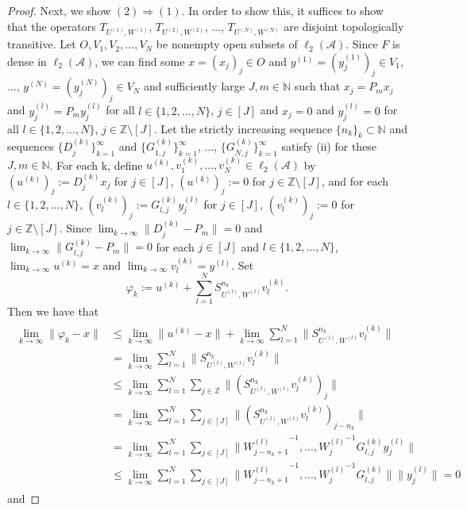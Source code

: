 \documentclass{article}
\begin{document}
\begin{proof}
Next, we show $(2)\Rightarrow(1)$. In order to show this, it suffices to show that the operators $T_{U^{(1)},W^{(1)}}$, $T_{U^{(2)},W^{(2)}}$, ..., $T_{U^{(N)},W^{(N)}}$ are disjoint topologically transitive. Let $O, V_{1}, V_{2}, ...,  V_{N}$ be nonempty open subsets of $\ell_{2}(\mathcal{A})$. Since $F$ is dense in $\ell_{2}(\mathcal{A})$, we can find some $x=(x_{j})_{j}\in O$ and $y^{(1)}=(y^{(1)}_{j})_{j}\in V_{1}$, ..., $y^{(N)}=(y^{(N)}_{j})_{j}\in V_{N}$ and sufficiently large $J, m\in\mathbb{N}$ such that $x_{j}=P_{m}x_{j}$ and $y^{(l)}_{j}=P_{m}y^{(l)}_{j}$ for all $l\in\{1,2,...,N\}$,   $j\in[J]$ and $x_{j}=0$ and $y^{(l)}_{j}=0$ for all $l\in\{1,2,...,N\}$, $j\in \mathbb{Z}\setminus[J]$. Let the strictly increasing sequence $\{n_{k}\}_{k}\subset\mathbb{N}$ and sequences $\{D^{(k)}_{j}\}^{\infty}_{k=1}$ and $\{G^{(k)}_{1,j}\}^{\infty}_{k=1}$, ..., $\{G^{(k)}_{N,j}\}^{\infty}_{k=1}$ satisfy (ii) for these $J,m\in\mathbb{N}$. For each k, define $u^{(k)}, v^{(k)}_{1}, ..., v^{(k)}_{N}\in \ell_{2}(\mathcal{A})$ by $(u^{(k)})_{j}:=D^{(k)}_{j}x_{j}$ for $j\in[J]$, $(u^{(k)})_{j}:=0$ for $j\in \mathbb{Z}\setminus [J]$, and for each $l\in\{1,2,...,N\}$, $(v^{(k)}_{l})_{j}:=G^{(k)}_{l, j}y^{(l)}_{j}$ for $j\in[J]$, $(v^{(k)}_{l})_{j}:=0$ for $j\in \mathbb{Z}\setminus [J]$. Since $\lim_{k\rightarrow\infty}\|D^{(k)}_{j}-P_{m}\|=0$ and $\lim_{k\rightarrow\infty}\|G^{(k)}_{l,j}-P_{m}\|=0$  for each $j\in [J]$ and $l\in\{1,2,...,N\}$, $\lim_{k\rightarrow\infty}u^{(k)}=x$ and $\lim_{k\rightarrow\infty}v^{(k)}_{l}=y^{(l)}$. Set
\[\varphi_{k}:=u^{(k)}+\sum^{N}_{l=1}S^{n_{k}}_{U^{(l)},W^{(l)}}v^{(k)}_{l}.\]
Then we have that
\begin{eqnarray}\begin{split}\nonumber
\lim_{k\rightarrow\infty}\|\varphi_{k}-x\|&\leq \lim_{k\rightarrow\infty}\|u^{(k)}-x\|+ \lim_{k\rightarrow\infty}\sum^{N}_{l=1}\|S^{n_{k}}_{U^{(l)},W^{(l)}}v^{(k)}_{l}\|\\
&=\lim_{k\rightarrow\infty}\sum^{N}_{l=1}\|S^{n_{k}}_{U^{(l)},W^{(l)}}v^{(k)}_{l}\|\\
&\leq
\lim_{k\rightarrow\infty}\sum^{N}_{l=1}\sum_{j\in\mathbb{Z}}\|(S^{n_{k}}_{U^{(l)},W^{(l)}}v^{(k)}_{l})_{j}\|\\
&=\lim_{k\rightarrow\infty}\sum^{N}_{l=1}\sum_{j\in[J]}\|(S^{n_{k}}_{U^{(l)},W^{(l)}}v^{(k)}_{l})_{j-n_{k}}\|\\
&=\lim_{k\rightarrow\infty}\sum^{N}_{l=1}\sum_{j\in[J]}\|{W^{(l)}_{j-n_{k}+1}}^{-1},...,{W^{(l)}_{j}}^{-1} G^{(k)}_{l,j}y^{(l)}_{j}\|\\
&\leq\lim_{k\rightarrow\infty}\sum^{N}_{l=1}\sum_{j\in[J]}\|{W^{(l)}_{j-n_{k}+1}}^{-1},...,{W^{(l)}_{j}}^{-1} G^{(k)}_{l,j}\| \|y^{(l)}_{j}\|=0
\end{split}\end{eqnarray}
and


\end{proof}
\end{document}
